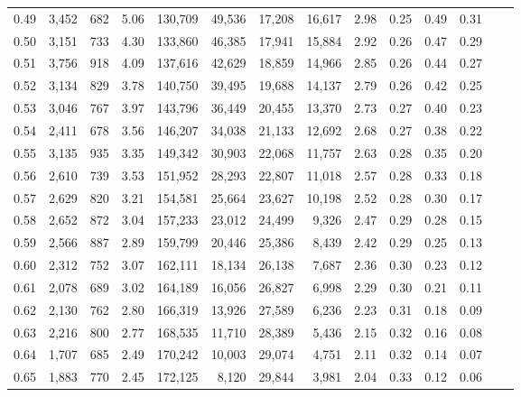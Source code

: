 \begin{tabular}{rrrrrrrrrrrrrr}
0.49 &  3,452 &    682 &    5.06 &  130,709 &   49,536 &  17,208 &  16,617 &  2.98 &  0.25 &  0.49 &      0.31 \\
0.50 &  3,151 &    733 &    4.30 &  133,860 &   46,385 &  17,941 &  15,884 &  2.92 &  0.26 &  0.47 &      0.29 \\
0.51 &  3,756 &    918 &    4.09 &  137,616 &   42,629 &  18,859 &  14,966 &  2.85 &  0.26 &  0.44 &      0.27 \\
0.52 &  3,134 &    829 &    3.78 &  140,750 &   39,495 &  19,688 &  14,137 &  2.79 &  0.26 &  0.42 &      0.25 \\
0.53 &  3,046 &    767 &    3.97 &  143,796 &   36,449 &  20,455 &  13,370 &  2.73 &  0.27 &  0.40 &      0.23 \\
0.54 &  2,411 &    678 &    3.56 &  146,207 &   34,038 &  21,133 &  12,692 &  2.68 &  0.27 &  0.38 &      0.22 \\
0.55 &  3,135 &    935 &    3.35 &  149,342 &   30,903 &  22,068 &  11,757 &  2.63 &  0.28 &  0.35 &      0.20 \\
0.56 &  2,610 &    739 &    3.53 &  151,952 &   28,293 &  22,807 &  11,018 &  2.57 &  0.28 &  0.33 &      0.18 \\
0.57 &  2,629 &    820 &    3.21 &  154,581 &   25,664 &  23,627 &  10,198 &  2.52 &  0.28 &  0.30 &      0.17 \\
0.58 &  2,652 &    872 &    3.04 &  157,233 &   23,012 &  24,499 &   9,326 &  2.47 &  0.29 &  0.28 &      0.15 \\
0.59 &  2,566 &    887 &    2.89 &  159,799 &   20,446 &  25,386 &   8,439 &  2.42 &  0.29 &  0.25 &      0.13 \\
0.60 &  2,312 &    752 &    3.07 &  162,111 &   18,134 &  26,138 &   7,687 &  2.36 &  0.30 &  0.23 &      0.12 \\
0.61 &  2,078 &    689 &    3.02 &  164,189 &   16,056 &  26,827 &   6,998 &  2.29 &  0.30 &  0.21 &      0.11 \\
0.62 &  2,130 &    762 &    2.80 &  166,319 &   13,926 &  27,589 &   6,236 &  2.23 &  0.31 &  0.18 &      0.09 \\
0.63 &  2,216 &    800 &    2.77 &  168,535 &   11,710 &  28,389 &   5,436 &  2.15 &  0.32 &  0.16 &      0.08 \\
0.64 &  1,707 &    685 &    2.49 &  170,242 &   10,003 &  29,074 &   4,751 &  2.11 &  0.32 &  0.14 &      0.07 \\
0.65 &  1,883 &    770 &    2.45 &  172,125 &    8,120 &  29,844 &   3,981 &  2.04 &  0.33 &  0.12 &      0.06 \\

\end{tabular}
